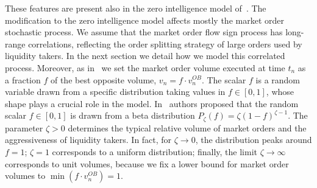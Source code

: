 \documentclass[12pt]{iopart}
\begin{document}
These features are present also in the zero intelligence model of~\cite{smith2003statistical,cont2013price}. The modification to the zero intelligence model affects mostly the market order stochastic process. We assume that the market order flow sign process has long-range correlations, reflecting the order splitting strategy of large orders used by liquidity takers. In the next section we detail how we model this correlated process. Moreover, as in~\cite{toth2011anomalous} we set the market order volume executed at time $t_n$ as a fraction $f$ of the best opposite volume, $v_n=f\cdot v_n^{OB}$. The scalar $f$ is a random variable drawn from a specific distribution taking values in $f\in[0,1]$, whose shape plays a crucial role in the model. In~\cite{toth2011anomalous} authors proposed that the random scalar $f \in [0,1]$ is drawn from a beta distribution $P_\zeta(f)=\zeta(1-f)^{\zeta-1}$. The parameter $\zeta > 0$ determines the typical relative volume of market orders and the aggressiveness of liquidity takers. In fact, for $\zeta\rightarrow 0$, the distribution peaks around $f=1$; $\zeta=1$ corresponds to a uniform distribution; finally, the limit $\zeta\rightarrow\infty$ corresponds to unit volumes, because we fix a lower bound for market order volumes to $\min(f \cdot v_n^{OB})=1$.
\end{document}
